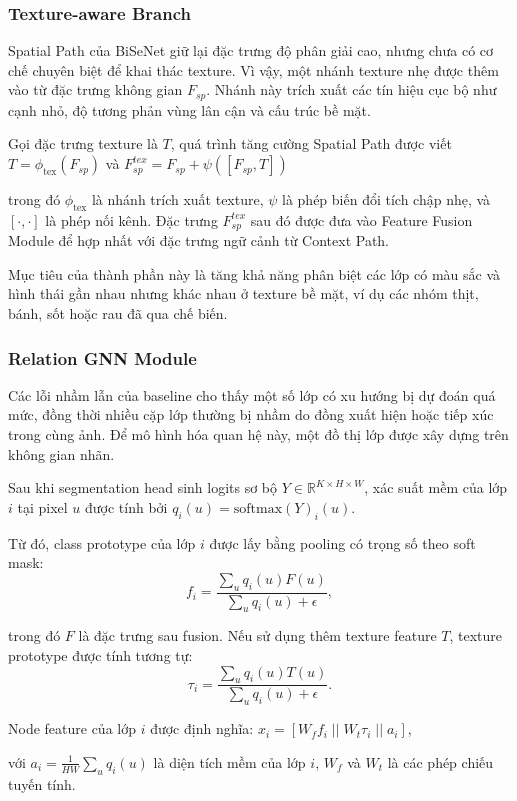 \subsubsection{Texture-aware Branch}

Spatial Path của BiSeNet giữ lại đặc trưng độ phân giải cao, nhưng chưa có cơ chế chuyên biệt để khai thác texture. Vì vậy, một nhánh texture nhẹ được thêm vào từ đặc trưng không gian $F_{sp}$. Nhánh này trích xuất các tín hiệu cục bộ như cạnh nhỏ, độ tương phản vùng lân cận và cấu trúc bề mặt.

Gọi đặc trưng texture là $T$, quá trình tăng cường Spatial Path được viết $ T = \phi_{\text{tex}}(F_{sp})$ và $F_{sp}^{tex} = F_{sp} + \psi([F_{sp}, T])$

trong đó $\phi_{\text{tex}}$ là nhánh trích xuất texture, $\psi$ là phép biến đổi tích chập nhẹ, và $[\cdot,\cdot]$ là phép nối kênh. Đặc trưng $F_{sp}^{tex}$ sau đó được đưa vào Feature Fusion Module để hợp nhất với đặc trưng ngữ cảnh từ Context Path.

Mục tiêu của thành phần này là tăng khả năng phân biệt các lớp có màu sắc và hình thái gần nhau nhưng khác nhau ở texture bề mặt, ví dụ các nhóm thịt, bánh, sốt hoặc rau đã qua chế biến.

\subsubsection{Relation GNN Module}

Các lỗi nhầm lẫn của baseline cho thấy một số lớp có xu hướng bị dự đoán quá mức, đồng thời nhiều cặp lớp thường bị nhầm do đồng xuất hiện hoặc tiếp xúc trong cùng ảnh. Để mô hình hóa quan hệ này, một đồ thị lớp được xây dựng trên không gian nhãn.

Sau khi segmentation head sinh logits sơ bộ $Y \in \mathbb{R}^{K \times H \times W}$, xác suất mềm của lớp $i$ tại pixel $u$ được tính bởi $q_i(u) = \mathrm{softmax}(Y)_i(u)$.

Từ đó, class prototype của lớp $i$ được lấy bằng pooling có trọng số theo soft mask:
\[
f_i =
\frac{\sum_{u} q_i(u)F(u)}
{\sum_{u}q_i(u)+\epsilon},
\]

trong đó $F$ là đặc trưng sau fusion. Nếu sử dụng thêm texture feature $T$, texture prototype được tính tương tự:
\[
\tau_i =
\frac{\sum_{u} q_i(u)T(u)}
{\sum_{u}q_i(u)+\epsilon}.
\]

Node feature của lớp $i$ được định nghĩa: $x_i = [W_f f_i \; || \; W_t \tau_i \; || \; a_i]$,

với $a_i = \frac{1}{HW}\sum_u q_i(u)$ là diện tích mềm của lớp $i$, $W_f$ và $W_t$ là các phép chiếu tuyến tính.

